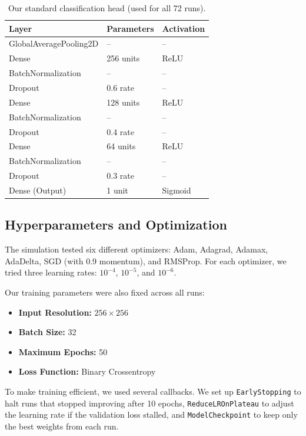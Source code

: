 \begin{table}[H]
  \centering
  \caption[Classification Head]{Our standard classification head (used for all 72 runs).}
  \label{tab:head}
  \begin{tabular}{lll}
    \toprule
    \rowcolor{tableheader}
    \textbf{Layer} & \textbf{Parameters} & \textbf{Activation} \\
    \midrule
    GlobalAveragePooling2D & -- & -- \\
    Dense & 256 units & ReLU \\
    BatchNormalization & -- & -- \\
    Dropout & 0.6 rate & -- \\
    Dense & 128 units & ReLU \\
    BatchNormalization & -- & -- \\
    Dropout & 0.4 rate & -- \\
    Dense & 64 units & ReLU \\
    BatchNormalization & -- & -- \\
    Dropout & 0.3 rate & -- \\
    Dense (Output) & 1 unit & Sigmoid \\
    \bottomrule
  \end{tabular}
\end{table}

\subsection{Hyperparameters and Optimization}

The simulation tested six different optimizers: Adam, Adagrad, Adamax, AdaDelta, SGD (with 0.9 momentum), and RMSProp. For each optimizer, we tried three learning rates: $10^{-4}$, $10^{-5}$, and $10^{-6}$.

Our training parameters were also fixed across all runs:
\begin{itemize}
    \item \textbf{Input Resolution:} $256 \times 256$
    \item \textbf{Batch Size:} 32
    \item \textbf{Maximum Epochs:} 50
    \item \textbf{Loss Function:} Binary Crossentropy
\end{itemize}

To make training efficient, we used several callbacks. We set up \texttt{EarlyStopping} to halt runs that stopped improving after 10 epochs, \texttt{ReduceLROnPlateau} to adjust the learning rate if the validation loss stalled, and \texttt{ModelCheckpoint} to keep only the best weights from each run.

